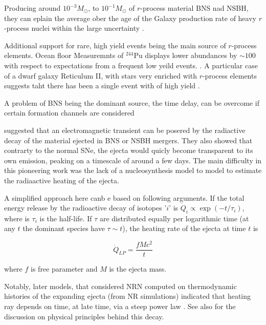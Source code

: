 \documentclass[11pt,a4paper,headinclude=true,DIV=14,BCOR=8mm,chapterprefix,listof=totoc,twoside,openright,abstracton]{scrbook}
\begin{document}
Producing around $10^{-3}M_{\odot}$, to $10^{-1}M_{\odot}$ of $r$-process material BNS nad NSBH, they can eplain the average ober the age of the Galaxy production rate of heavy $r$-process nuclei within the large uncertainty \cite{(Qian 2000),(Bauswein et al 2013a).}. 

Additional support for rare, high yield events being the main source of $r$-process elements.
Ocean floor Measuremnts of $^{244}$Pu displays lower abundances by $\sim 100$ with respect to expectations from a frequent low yeild events. \cite{(Wallner et al 2015; Hotokezaka et al 2015)}. 
A particular case of a dwarf galaxy Reticulum II, with stars very enriched with $r$-process elements suggests taht there has been a single event with of high yield \cite{(Ji et al 2016)}.

A problem of BNS being the dominant source, the time delay, can be overcome if certain formation channels are considered \cite{(Belczynski et al 2002; Voss and Tauris 2003; Ramirez-Ruiz et al 2015)}


\cite{Li and Paczynski (1998)} suggested that an electromagnetic transient can be posered by the radiactive decay of the material ejected in BNS or NSBH mergers. They also showed that contrarty to the normal SNe, the ejecta would quicly become transparent to its own emission, peaking on a timescale of around a few days. 
The main difficulty in this pioneering work was the lack of a nucleosynthesis model to model to estimate the radiaactive heating of the ejecta. 

A simplified approach here canb e based on following arguments. If the total energy release by the radioactive decay of isotopes '$i$' is $\dot{Q}_i \propto \exp(-t/\tau_i)$, where is $\tau_i$ is the half-life. If $\tau$ are distributed equally per logarithmic time (at any $t$ the dominant species have $\tau\sim t$), the heating rate of the ejecta at time $t$ is

\begin{equation}
    \dot{Q}_{LP} = \frac{f M c^2}{t}
\end{equation}

where $f$ is free parameter and $M$ is the ejecta mass.

Notably, later models, that considered NRN computed on thermodynamic histories of the expanding ejecta (from NR simulations) indicated that heating ray depends on time, at late time, via a steep power law \cite{(Metzger et al 2010b; Roberts et al 2011; Korobkin et al 2012)}. See also \cite{Hotokezaka et al (2017)}
for the discussion on physical principles behind this decay.
\end{document}
